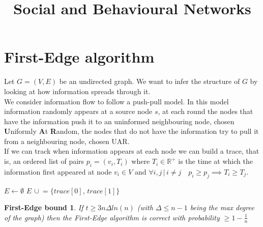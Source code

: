 \documentclass[]{article}
\title{Social and Behavioural Networks}
\author{}
\begin{document}
\maketitle
\tableofcontents

\clearpage

\section{First-Edge algorithm}
Let $G = (V, E)$ be an undirected graph. We want to infer the structure of $G$ by looking at how information spreads through it.\\We consider information flow to follow a push-pull model. In this model information randomly appears at a source node $s$, at each round the nodes that have the information push it to an uninformed neighbouring node, chosen \textbf{U}niformly \textbf{A}t \textbf{R}andom, the nodes that do not have the information try to pull it from a neighbouring node, chosen UAR.\\If we can track when information appears at each node we can build a trace, that is, an ordered list of pairs $p_i = (v_i, T_i)$ where $T_i \in \mathbb{R}^+$ is the time at which the information first appeared at node $v_i \in V$ and $\forall i,j \, |\, i\neq j  \quad p_i \geq p_j \implies T_i \geq T_j$.

\begin{algorithm}[H]
	\caption{First-Edge( set of traces: Traces)}
	\label{alg:first-edge}
	\begin{algorithmic}
		\STATE $E \leftarrow \emptyset$
			\STATE $E\, \cup\!= \{trace[0],\, trace[1]\}$
		\ENDFOR
	\end{algorithmic}
\end{algorithm}

\newtheorem*{FirstEdgeBound}{First-Edge bound}
\begin{FirstEdgeBound}
	If $t\geq3n\Delta ln(n)$ (with $\Delta \leq n-1$ being the max degree of the graph) then the First-Edge algorithm is correct with probability $\geq 1-\frac{1}{n}$
\end{FirstEdgeBound}
\end{document}

